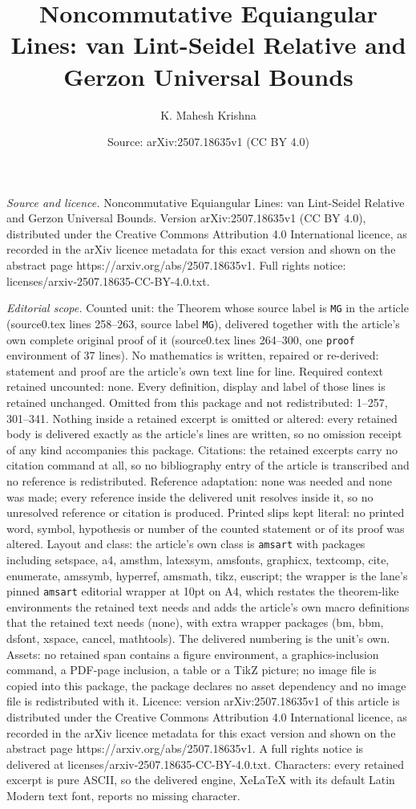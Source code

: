 \documentclass[10pt,a4paper]{amsart}
\title[Noncommutative Equiangular Lines: van Lint-Seidel Relative a]{Noncommutative Equiangular Lines: van Lint-Seidel Relative and Gerzon Universal Bounds}
\author{K. Mahesh Krishna}
\date{Source: arXiv:2507.18635v1 (CC BY 4.0)}
\begin{document}
\maketitle

\noindent\emph{Source and licence.} Noncommutative Equiangular Lines: van Lint-Seidel Relative and Gerzon Universal Bounds. Version arXiv:2507.18635v1 (CC BY 4.0), distributed under the Creative Commons Attribution 4.0 International licence, as recorded in the arXiv licence metadata for this exact version and shown on the abstract page https://arxiv.org/abs/2507.18635v1. Full rights notice: licenses/arxiv-2507.18635-CC-BY-4.0.txt.\par\smallskip

\noindent\textit{Editorial scope.} Counted unit: the Theorem whose source label is \texttt{MG} in the article (source0.tex lines 258--263, source label \texttt{MG}), delivered together with the article's own complete original proof of it (source0.tex lines 264--300, one \texttt{proof} environment of 37 lines). No mathematics is written, repaired or re-derived: statement and proof are the article's own text line for line. Required context retained uncounted: none. Every definition, display and label of those lines is retained unchanged. Omitted from this package and not redistributed: 1--257, 301--341. Nothing inside a retained excerpt is omitted or altered: every retained body is delivered exactly as the article's lines are written, so no omission receipt of any kind accompanies this package. Citations: the retained excerpts carry no citation command at all, so no bibliography entry of the article is transcribed and no reference is redistributed. Reference adaptation: none was needed and none was made; every reference inside the delivered unit resolves inside it, so no unresolved reference or citation is produced. Printed slips kept literal: no printed word, symbol, hypothesis or number of the counted statement or of its proof was altered. Layout and class: the article's own class is \texttt{amsart} with packages including setspace, a4, amsthm, latexsym, amsfonts, graphicx, textcomp, cite, enumerate, amssymb, hyperref, amsmath, tikz, euscript; the wrapper is the lane's pinned \texttt{amsart} editorial wrapper at 10pt on A4, which restates the theorem-like environments the retained text needs and adds the article's own macro definitions that the retained text needs (none), with extra wrapper packages (bm, bbm, dsfont, xspace, cancel, mathtools). The delivered numbering is the unit's own. Assets: no retained span contains a figure environment, a graphics-inclusion command, a PDF-page inclusion, a table or a TikZ picture; no image file is copied into this package, the package declares no asset dependency and no image file is redistributed with it. Licence: version arXiv:2507.18635v1 of this article is distributed under the Creative Commons Attribution 4.0 International licence, as recorded in the arXiv licence metadata for this exact version and shown on the abstract page https://arxiv.org/abs/2507.18635v1. A full rights notice is delivered at licenses/arxiv-2507.18635-CC-BY-4.0.txt. Characters: every retained excerpt is pure ASCII, so the delivered engine, XeLaTeX with its default Latin Modern text font, reports no missing character.
\end{document}
